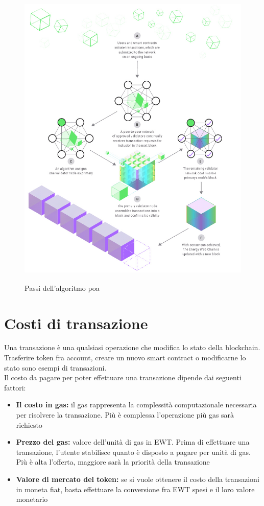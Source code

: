 \documentclass[12pt, letterpaper, twoside]{article}
\begin{document}
\begin{figure}[!h]
    \includegraphics[height=14cm,keepaspectratio]{ew-poa}
    \centering
    \label{ew-poa}
    \caption{Passi dell'algoritmo \gls{poa} \cite{img:ew-poa}}
\end{figure}
 
\newpage
 
\section{Costi di transazione}
Una transazione è una qualsiasi operazione che modifica lo stato della blockchain. Trasferire token fra account, creare un nuovo smart contract o modificarne lo stato sono esempi di transazioni. \\
Il costo da pagare per poter effettuare una transazione dipende dai seguenti fattori:
 
\begin{itemize}
    \item \textbf{Il costo in gas:} il gas rappresenta la complessità computazionale necessaria per risolvere la transazione. Più è complessa l'operazione più gas sarà richiesto
    \item \textbf{Prezzo del gas:} valore dell'unità di gas in EWT. Prima di effettuare una transazione, l'utente stabilisce quanto è disposto a pagare per unità di gas. Più è alta l'offerta, maggiore sarà la priorità della transazione
    \item \textbf{Valore di mercato del token:} se si vuole ottenere il costo della transazioni in moneta fiat, basta effettuare la conversione fra EWT spesi e il loro valore monetario
\end{itemize}
 
\end{document}

